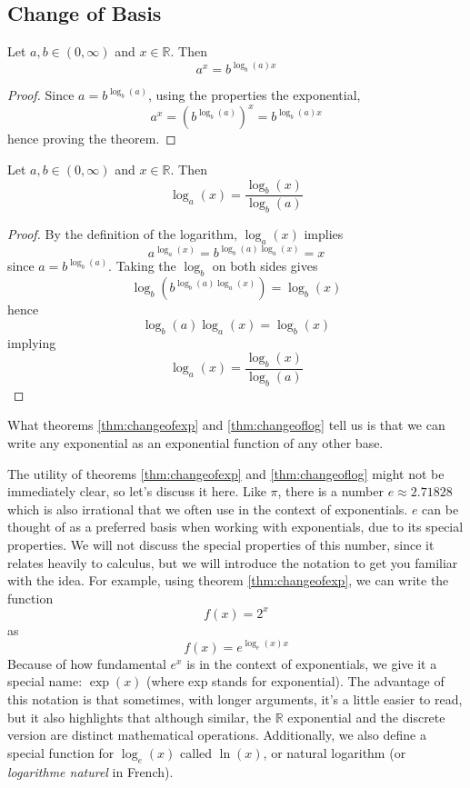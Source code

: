 \documentclass[11pt]{article}
\numberwithin{lemma}{section}
\numberwithin{equation}{section}
\numberwithin{define}{section}
\numberwithin{prop}{section}
\numberwithin{figure}{section}
\numberwithin{theorem}{section}
\numberwithin{cor}{section}
\newcounter{ex}[section]
\numberwithin{ex}{section}
\def\real{\mathbb{R}}
\begin{document}
\subsection{Change of Basis}
\begin{theorem}
Let $a,b\in(0,\infty)$ and $x\in\real$. Then
$$a^x=b^{\log_b(a)x}$$	
\label{thm:changeofexp}
\end{theorem}
\begin{proof}
	Since $a=b^{\log_b(a)}$, using the properties the exponential,
	$$a^x=(b^{\log_b(a)})^x=b^{\log_b(a)x}$$
	hence proving the theorem.
\end{proof}

\begin{theorem}
	Let $a,b\in(0,\infty)$ and $x\in\real$. Then
	$$\log_a(x)=\frac{\log_b(x)}{\log_b(a)}$$
	
	\label{thm:changeoflog}
\end{theorem}
\begin{proof}
	By the definition of the logarithm, $\log_a(x)$ implies
	$$a^{\log_a(x)}=b^{\log_b(a)\log_a(x)}=x$$
	since $a=b^{\log_b(a)}$.
	Taking the $\log_b$ on both sides gives
	$$\log_b(b^{\log_b(a)\log_a(x)})=\log_b(x)$$
	hence
	$$\log_b(a)\log_a(x)=\log_b(x)$$
	implying
	$$\log_a(x)=\frac{\log_b(x)}{\log_b(a)}$$
\end{proof}

What theorems \eqref{thm:changeofexp} and \eqref{thm:changeoflog} tell us is that we can write any exponential as an exponential function of any other base.

The utility of theorems \eqref{thm:changeofexp} and \eqref{thm:changeoflog} might not be immediately clear, so let's discuss it here. 
Like $\pi$, there is a number $e\approx 2.71828$ which is also irrational that we often use in the context of exponentials. $e$ can be thought of as a preferred basis when working with exponentials, due to its special properties. 
We will not discuss the special properties of this number, since it relates heavily to calculus, but we will introduce the notation to get you familiar with the idea.
For example, using theorem \eqref{thm:changeofexp}, we can write the function
$$f(x)=2^x$$
as
$$f(x)=e^{\log_e(x)x}$$
Because of how fundamental $e^x$ is in the context of exponentials, we give it a special name: $\exp(x)$ (where exp stands for exponential). 
The advantage of this notation is that sometimes, with longer arguments, it's a little easier to read, but it also highlights that although similar, the $\real$ exponential and the discrete version are distinct mathematical operations.
Additionally, we also define a special function for $\log_e(x)$ called $\ln(x)$, or natural logarithm (or \textit{logarithme naturel}  in French). 
\end{document}
